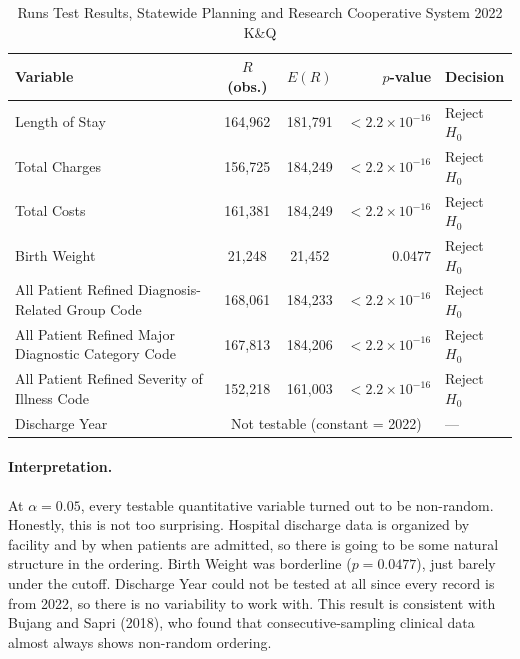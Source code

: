 \documentclass[12pt]{article}
\begin{document}
\begin{table}[H]
\centering
\caption{Runs Test Results, Statewide Planning and Research Cooperative System 2022 K\&Q}
\label{tab:runs}
\begin{tabular}{lccr l}
\toprule
\textbf{Variable} & $R$ (obs.) & $E(R)$ & \textbf{$p$-value} & \textbf{Decision} \\
\midrule
Length of Stay                & 164{,}962 & 181{,}791 & $< 2.2\times 10^{-16}$ & Reject $H_0$ \\
Total Charges                 & 156{,}725 & 184{,}249 & $< 2.2\times 10^{-16}$ & Reject $H_0$ \\
Total Costs                   & 161{,}381 & 184{,}249 & $< 2.2\times 10^{-16}$ & Reject $H_0$ \\
Birth Weight                  &  21{,}248 &  21{,}452 & $0.0477$              & Reject $H_0$ \\
All Patient Refined Diagnosis-Related Group Code                  & 168{,}061 & 184{,}233 & $< 2.2\times 10^{-16}$ & Reject $H_0$ \\
All Patient Refined Major Diagnostic Category Code                  & 167{,}813 & 184{,}206 & $< 2.2\times 10^{-16}$ & Reject $H_0$ \\
All Patient Refined Severity of Illness Code  & 152{,}218 & 161{,}003 & $< 2.2\times 10^{-16}$ & Reject $H_0$ \\
Discharge Year                & \multicolumn{3}{c}{Not testable (constant = 2022)} & --- \\
\bottomrule
\end{tabular}
\end{table}

\paragraph{Interpretation.}
At $\alpha = 0.05$, every testable quantitative variable turned out to
be non-random. Honestly, this is not too surprising. Hospital discharge
data is organized by facility and by when patients are admitted, so
there is going to be some natural structure in the ordering. Birth
Weight was borderline ($p = 0.0477$), just barely under the cutoff.
Discharge Year could not be tested at all since every record is from
2022, so there is no variability to work with. This result is
consistent with Bujang and Sapri (2018), who found that
consecutive-sampling clinical data almost always shows non-random
ordering.
\end{document}
